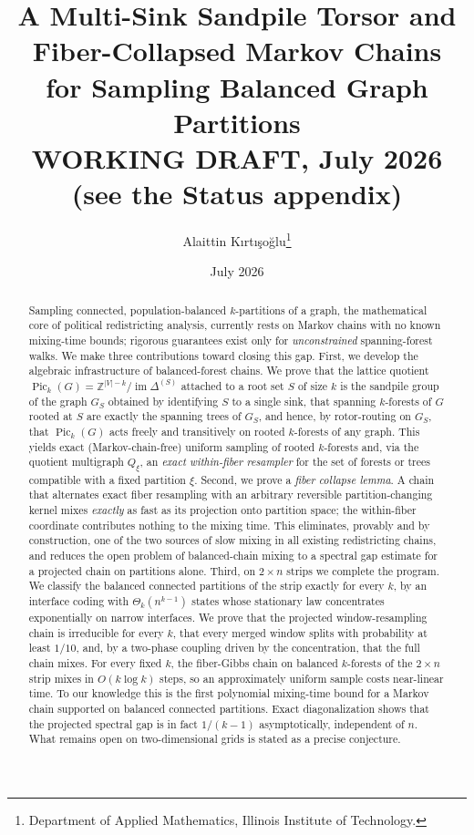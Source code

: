 \documentclass[11pt]{article}
\title{A Multi-Sink Sandpile Torsor and Fiber-Collapsed Markov Chains\\
for Sampling Balanced Graph Partitions\\
{\large \textcolor{misscol}{WORKING DRAFT, July 2026 (see the Status appendix)}}}
\author{Alaittin K\i rt\i \c{s}o\u{g}lu\thanks{Department of Applied
Mathematics, Illinois Institute of Technology.}}
\date{July 2026}
\newcommand{\Z}{\mathbb{Z}}
\newcommand{\Pick}[1]{\operatorname{Pic}_k(#1)}
\newcommand{\im}{\operatorname{im}}
\begin{document}
\maketitle

\begin{abstract}
Sampling connected, population-balanced $k$-partitions of a graph, the
mathematical core of political redistricting analysis, currently rests on
Markov chains with no known mixing-time bounds; rigorous guarantees exist only
for \emph{unconstrained} spanning-forest walks. We make three contributions
toward closing this gap. First, we develop the algebraic infrastructure of
balanced-forest chains. We prove that the lattice quotient
$\Pick{G} = \Z^{|V|-k}/\im \Delta^{(S)}$ attached to a root set $S$ of size $k$
is the sandpile group of the graph $G_S$ obtained by identifying $S$ to a
single sink, that spanning $k$-forests of $G$ rooted at $S$ are exactly the
spanning trees of $G_S$, and hence, by rotor-routing on $G_S$, that
$\Pick{G}$ acts freely and transitively on rooted $k$-forests of any graph.
This yields exact (Markov-chain-free) uniform sampling of rooted $k$-forests
and, via the quotient multigraph $Q_\xi$, an \emph{exact within-fiber
resampler} for the set of forests or trees compatible with a fixed partition
$\xi$. Second, we prove a \emph{fiber collapse lemma}. A chain that
alternates exact fiber resampling with an arbitrary reversible
partition-changing kernel mixes \emph{exactly} as fast as its projection
onto partition space; the within-fiber coordinate contributes nothing to
the mixing time. This eliminates, provably and by construction, one of the two
sources of slow mixing in all existing redistricting chains, and reduces the
open problem of balanced-chain mixing to a spectral gap estimate for a
projected chain on partitions alone. Third, on $2 \times n$ strips we
complete the program. We classify the balanced connected partitions of the strip
exactly for every $k$, by an interface coding with $\Theta_k(n^{k-1})$
states whose stationary law concentrates exponentially on narrow
interfaces. We prove that the projected window-resampling chain is
irreducible for every $k$, that every merged window splits with
probability at least $1/10$, and, by a two-phase coupling driven by the
concentration, that the full chain mixes. For every fixed $k$, the
fiber-Gibbs chain on balanced $k$-forests of the $2 \times n$ strip
mixes in $O(k \log k)$ steps, so an approximately uniform sample costs
near-linear time. To our knowledge this is the first polynomial
mixing-time bound for a Markov chain supported on balanced connected
partitions. Exact diagonalization shows that the projected spectral gap
is in fact $1/(k-1)$ asymptotically, independent of $n$. What remains
open on two-dimensional grids is stated as a precise conjecture.
\end{abstract}
\end{document}
